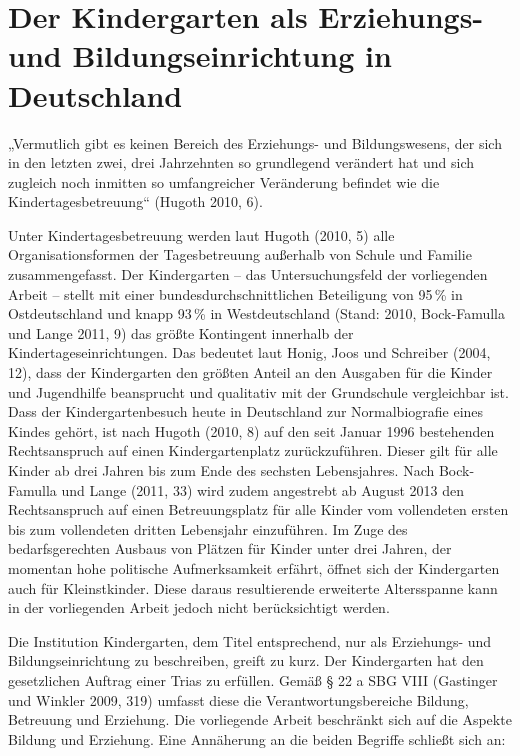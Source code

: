 \chapter{Der Kindergarten als Erziehungs- und Bildungseinrichtung in Deutschland}

„Vermutlich gibt es keinen Bereich des Erziehungs- und Bildungswesens, der sich in den letzten zwei, drei Jahrzehnten so grundlegend verändert hat und sich zugleich noch inmitten so umfangreicher Veränderung befindet wie die Kindertagesbetreuung“ (Hugoth 2010, 6).

Unter Kindertagesbetreuung werden laut Hugoth (2010, 5) alle Organisationsformen der Tagesbetreuung außerhalb von Schule und Familie zusammengefasst. Der Kindergarten -- das Untersuchungsfeld der vorliegenden Arbeit -- stellt mit einer bundesdurchschnittlichen Beteiligung von 95\,\% in Ostdeutschland und knapp 93\,\% in Westdeutschland (Stand: 2010, Bock-Famulla und Lange 2011, 9) das größte Kontingent innerhalb der Kindertageseinrichtungen. Das bedeutet laut Honig, Joos  und Schreiber (2004, 12), dass der Kindergarten den größten Anteil an den Ausgaben für die Kinder und Jugendhilfe beansprucht und qualitativ mit der Grundschule vergleichbar ist. Dass der Kindergartenbesuch heute in Deutschland zur Normalbiografie eines Kindes gehört, ist nach Hugoth (2010, 8) auf den seit Januar 1996 bestehenden Rechtsanspruch auf einen Kindergartenplatz zurückzuführen. Dieser gilt für alle Kinder ab drei Jahren bis zum Ende des sechsten Lebensjahres. Nach Bock-Famulla und Lange (2011, 33) wird zudem angestrebt ab August 2013 den Rechtsanspruch auf einen Betreuungsplatz für alle Kinder vom vollendeten ersten bis zum vollendeten dritten Lebensjahr einzuführen. Im Zuge des bedarfsgerechten Ausbaus von Plätzen für Kinder unter drei Jahren, der momentan hohe politische Aufmerksamkeit erfährt, öffnet sich der Kindergarten auch für Kleinstkinder. Diese daraus resultierende erweiterte Altersspanne kann in der vorliegenden Arbeit jedoch nicht berücksichtigt werden.

Die Institution Kindergarten, dem Titel entsprechend, nur als Erziehungs- und Bildungseinrichtung zu beschreiben, greift zu kurz. Der Kindergarten hat den gesetzlichen Auftrag einer Trias zu erfüllen. Gemäß § 22 a SBG VIII (Gastinger und Winkler 2009, 319) umfasst diese die Verantwortungsbereiche Bildung, Betreuung und Erziehung. Die vorliegende Arbeit beschränkt sich auf die Aspekte Bildung und Erziehung. 
Eine Annäherung an die beiden Begriffe schließt sich an: 

